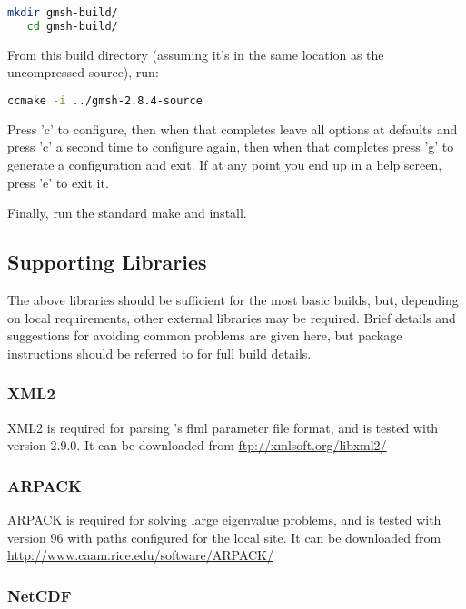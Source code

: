 \begin{lstlisting}[language=bash]
   mkdir gmsh-build/
   cd gmsh-build/
\end{lstlisting}

From this build directory (assuming it's in the same location as the
uncompressed source), run:

\begin{lstlisting}[language=bash]
   ccmake -i ../gmsh-2.8.4-source
\end{lstlisting}

Press 'c' to configure, then when that completes leave all options at defaults
and press 'c' a second time to configure again, then when that completes press
'g' to generate a configuration and exit. If at any point you end up in a help
screen, press 'e' to exit it.

Finally, run the standard make and install.

\subsection{Supporting Libraries}
\label{sec:required_libraries_supporting}

The above libraries should be sufficient for the most basic \fluidity builds,
but, depending on local requirements, other external libraries may be required.
Brief details and suggestions for avoiding common problems are given here, but
package instructions should be referred to for full build details.

\subsubsection{XML2}
\label{sec:required_libraries_supporting_xml2}

XML2 is required for parsing \fluidity's flml parameter file format, and is
tested with version 2.9.0. It can be downloaded from \url{ftp://xmlsoft.org/libxml2/}

\subsubsection{ARPACK}
\label{sec:required_libraries_supporting_arpack}

ARPACK is required for solving large eigenvalue problems, and is tested with
version 96 with paths configured for the local site. It can be downloaded from
\url{http://www.caam.rice.edu/software/ARPACK/}

\subsubsection{NetCDF}
\label{sec:required_libraries_supporting_netcdf}

